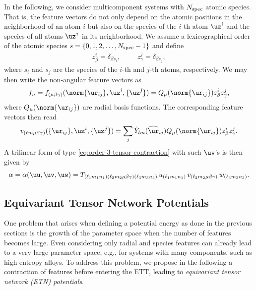 In the following, we consider multicomponent systems with $N_{\rm spec}$ atomic species.
That is, the feature vectors do not only depend on the atomic positions in the neighborhood of an atom $i$ but also on the species of the $i$-th atom $\uz^i$ and the species of all atoms $\uz^j$ in its neighborhood.
We assume a lexicographical order of the atomic species $s = \{0, 1, 2, \ldots, N_{\rm spec}-1 \}$ and define
\begin{align}\label{eq:type_features}
    z^i_\beta = \delta_{\beta s_i}, &&& z^j_\gamma = \delta_{\beta s_j},
\end{align}
where $s_i$ and $s_j$ are the species of the $i$-th and $j$-th atoms, respectively.
We may then write the non-angular feature vectors as
\begin{equation}
    f_n = f_{(\mu\beta\gamma)}(\norm{\ur_{ij}}, \uz^i, \{\uz^j\}) = Q_\mu(\norm{\ur_{ij}}) z^i_\beta z^j_\gamma,
\end{equation}
where $Q_\mu(\norm{\ur_{ij}})$ are radial basis functions.
The corresponding feature vectors then read
\begin{equation}
    v_{(\ell m\mu\beta\gamma)}(\{ \ur_{ij} \}, \uz^i, \{ \uz^j \})
    = \sum_j \dot Y_{lm}(\widehat\ur_{ij}) Q_\mu(\norm{\ur_{ij}}) z^i_\beta z^j_\gamma.
\end{equation}
A trilinear form of type \eqref{eq:order-3-tensor-contraction} with such $\uv$'s is then given by
\begin{equation}
    \alpha = \alpha(\uu,\uv,\uw) =
    T_{(\ell_1 m_1 n_1) (\ell_2 m_2 \mu\beta\gamma) (\ell_3 m_3 n_3)} \,
    u_{(\ell_1 m_1 n_1)} \,
    v_{(\ell_2 m_2 \mu\beta\gamma)} \,
    w_{(\ell_3 m_3 n_3)}.
\end{equation}

\subsection{Equivariant Tensor Network Potentials}
\label{sec:ETN-potentials}

One problem that arises when defining a potential energy as done in the previous sections is the growth of the parameter space when the number of features becomes large.
Even considering only radial and species features can already lead to a very large parameter space, e.g., for systems with many components, such as high-entropy alloys.
To address this problem, we propose in the following a contraction of features before entering the ETT, leading to \emph{equivariant tensor network (ETN) potentials}.

